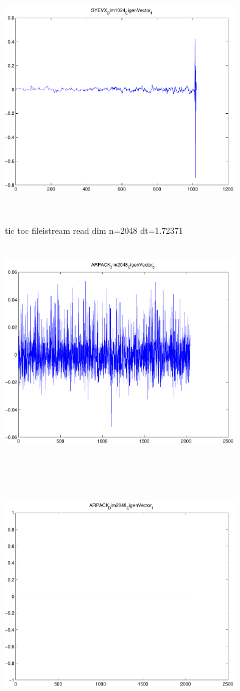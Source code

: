 \documentclass[9pt]{article}
\theoremstyle{plain}
\theoremstyle{definition}
\theoremstyle{remark}
\numberwithin{equation}{section}
\begin{document}
\includegraphics[width=10.0cm,height=10.0cm]{SYEVX_Dim1024_EigenVector_4.pdf}

tic toc fileistream read dim n=2048 dt=1.72371
\includegraphics[width=10.0cm,height=10.0cm]{ARPACK_Dim2048_EigenVector_0.pdf}

\includegraphics[width=10.0cm,height=10.0cm]{ARPACK_Dim2048_EigenVector_1.pdf}
\end{document}
